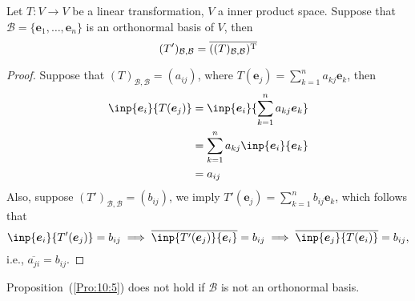 \begin{proposition}\label{Pro:10:5}
Let $T:V\to V$ be a linear transformation, $V$ a inner product space.
Suppose that $\mathcal{B}=\{\bm e_1,\dots,\bm e_n\}$ is an orthonormal basis of $V$, then
\[
(T')_{\mathcal{B},\mathcal{B}}=\overline{((T)_{\mathcal{B},\mathcal{B}})^{\mathrm T}}
\]
\end{proposition}

\begin{proof}
Suppose that $(T)_{\mathcal{B},\mathcal{B}}=(a_{ij})$, where $T(\bm e_j)=\sum_{k=1}^na_{kj}\bm e_k$, then
\begin{align*}
\inp{\bm e_i}{T(\bm e_j)}&=\inp{\bm e_i}{\sum_{k=1}^na_{kj}\bm e_k}\\
&=\sum_{k=1}^na_{kj}\inp{\bm e_i}{\bm e_k}\\
&=a_{ij}
\end{align*}
Also, suppose $(T')_{\mathcal{B},\mathcal{B}}=(b_{ij})$, we imply $T'(\bm e_j) = \sum_{k=1}^nb_{ij}\bm e_k$, which follows that
\[
\inp{\bm e_i}{T'(\bm e_j)}=b_{ij}
\implies
\overline{\inp{T'(\bm e_j)}{\bm e_i}}=b_{ij}
\implies
\overline{\inp{\bm e_j}{T(\bm e_i)}}=b_{ij},
\]
i.e., $\overline{a_{ji}} = b_{ij}$.
\end{proof}
\begin{remark}
Proposition~(\ref{Pro:10:5}) does not hold if $\mathcal{B}$ is not an orthonormal basis.
\end{remark}












